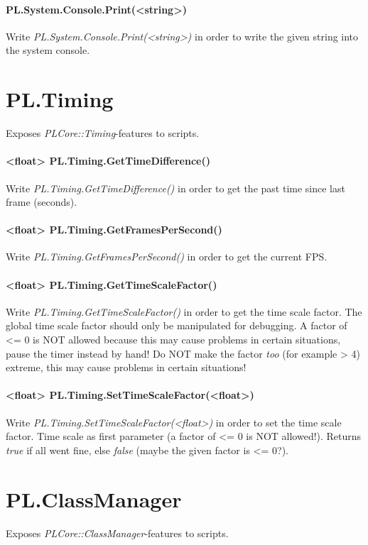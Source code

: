 \paragraph{PL.System.Console.Print(<string>)}
Write \emph{PL.System.Console.Print(<string>)} in order to write the given string into the system console.




\section{PL.Timing}
Exposes \emph{PLCore::Timing}-features to scripts.

\paragraph{<float> PL.Timing.GetTimeDifference()}
Write \emph{PL.Timing.GetTimeDifference()} in order to get the past time since last frame (seconds).

\paragraph{<float> PL.Timing.GetFramesPerSecond()}
Write \emph{PL.Timing.GetFramesPerSecond()} in order to get the current \ac{FPS}.

\paragraph{<float> PL.Timing.GetTimeScaleFactor()}
Write \emph{PL.Timing.GetTimeScaleFactor()} in order to get the time scale factor. The global time scale factor should only be manipulated for debugging. A factor of <= 0 is NOT allowed because this may cause problems in certain situations, pause the timer instead by hand! Do NOT make the factor \emph{too} (for example > 4) extreme, this may cause problems in certain situations!

\paragraph{<float> PL.Timing.SetTimeScaleFactor(<float>)}
Write \emph{PL.Timing.SetTimeScaleFactor(<float>)} in order to set the time scale factor. Time scale as first parameter (a factor of <= 0 is NOT allowed!). Returns \emph{true} if all went fine, else \emph{false} (maybe the given factor is <= 0?).




\section{PL.ClassManager}
Exposes \emph{PLCore::ClassManager}-features to scripts.

